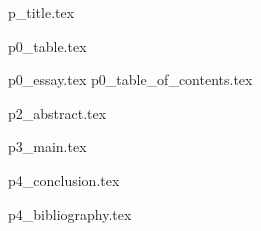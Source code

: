 \documentclass[a4paper,14pt]{extreport}
\begin{document}
{p_title.tex}

\newpage

\setcounter{page}{3}
\thispagestyle{empty}
{p0_table.tex}

\newpage
\thispagestyle{empty}
{p0_essay.tex}
\newpage
{p0_table_of_contents.tex}
\thispagestyle{empty}


\newpage
{p2_abstract.tex}

\newpage
{p3_main.tex}


\newpage
{p4_conclusion.tex}

\newpage
{p4_bibliography.tex}
\end{document}
